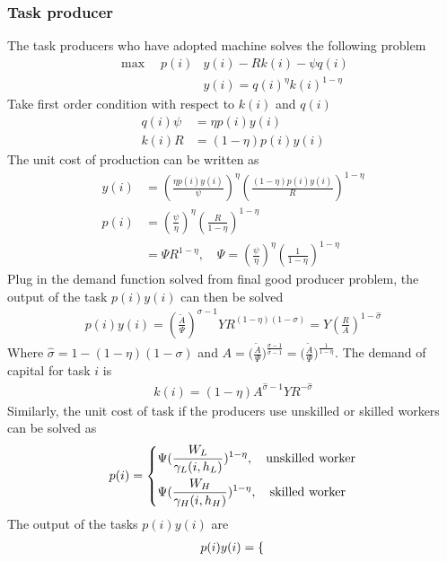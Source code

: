 \documentclass[12pt]{article}
\begin{document}
\begin{appendices}
\subsubsection*{Task producer}
The task producers who have adopted machine solves the following problem 
\begin{align*}
\max \quad  p(i)&y(i)-Rk(i)-\psi q(i) \\
&y(i) = q(i)^{\eta}k(i)^{1-\eta}
\end{align*}
Take first order condition with respect to $k(i)$ and $q(i)$
\begin{align*}
q(i)\psi &= \eta p(i)y(i) \\
k(i)R &= (1-\eta)p(i)y(i) 
\end{align*}
The unit cost of production can be written as 
\begin{align*}
y(i) &= (\frac{\eta p(i)y(i)}{\psi})^{\eta}(\frac{(1-\eta)p(i)y(i)}{R})^{1-\eta} \\
p(i) &= (\frac{\psi}{\eta})^{\eta} (\frac{R}{1-\eta})^{1-\eta} \\
 	  &= \Psi R^{1-\eta}, \quad \Psi =  (\frac{\psi}{\eta})^{\eta} (\frac{1}{1-\eta})^{1-\eta}
\end{align*}
Plug in the demand function solved from final good producer problem, the output of the task $p(i)y(i)$ can then be solved 
\begin{align*}
p(i)y(i) = (\frac{\tilde{A}}{\Psi})^{\sigma-1}YR^{(1-\eta)(1-\sigma)} = Y(\frac{R}{A})^{1-\hat{\sigma}}
\end{align*}
Where $\hat{\sigma} = 1-(1-\eta)(1-\sigma)$ and $A = \Big(\frac{\tilde{A}}{\Psi}\Big)^{\frac{\sigma-1}{\hat{\sigma}-1}}  = \Big(\frac{\tilde{A}}{\Psi}\Big)^{\frac{1}{1-\eta}}$. 
The demand of capital for task $i$ is 
\begin{align*}
k(i) = (1-\eta)A^{\hat{\sigma}-1}YR^{-\hat{\sigma}}
\end{align*}
Similarly, the unit cost of task if the producers use unskilled or skilled workers can be solved as 
\begin{align*}
p(i) =
\begin{dcases}
\Psi(\frac{W_L}{\gamma_L(i,h_L)})^{1-\eta}, \quad \text{unskilled worker}  \\
\Psi(\frac{W_H}{\gamma_H(i,h_H)})^{1-\eta}, \quad \text{skilled worker}
\end{dcases}
\end{align*}
The output of the tasks $p(i)y(i)$ are
\begin{align*}
p(i)y(i) =
\begin{dcases}

\end{dcases}
\end{align*}
\end{appendices}
\end{document}
